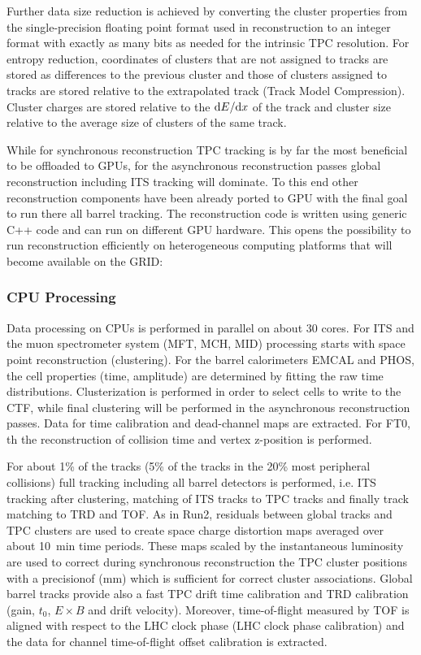 Further data size reduction is achieved by converting the cluster properties from the single-precision 
floating point format used in reconstruction to an integer format with exactly as many bits as needed 
for the intrinsic TPC resolution. For entropy reduction, coordinates of clusters that are not assigned 
to tracks are stored as differences to the previous cluster and those of clusters assigned to tracks 
are stored relative to the extrapolated track (Track Model Compression). Cluster charges are stored 
relative to the ${\rm d}E/{\rm d}x$ of the track and cluster size relative to the average size of 
clusters of the same track.

While for synchronous reconstruction TPC tracking is by far the most beneficial to be offloaded to GPUs, for the 
asynchronous reconstruction passes global reconstruction including ITS tracking will dominate. To this 
end other reconstruction components have been already ported to GPU with the final goal to run there 
all barrel tracking. The reconstruction code is written using generic C++ code and can run on different
GPU hardware. This opens the possibility to run reconstruction efficiently on heterogeneous  
computing platforms that will become available on the GRID:

\subsubsection*{\bf CPU Processing}
Data processing on CPUs is performed in parallel on about 30 cores.
For ITS and the muon spectrometer system (MFT, MCH, MID) processing starts with space point reconstruction (clustering). For the barrel calorimeters EMCAL and PHOS, the cell properties (time, amplitude) are determined by fitting the raw time distributions. Clusterization is performed in order to select cells to write to the CTF, while final clustering will be performed in the asynchronous reconstruction passes. Data for time calibration and dead-channel maps are extracted. For FT0, th the reconstruction of collision time and vertex z-position is performed.

For about 1\% of the tracks (5\% of the tracks in the 20\% most peripheral
collisions) full tracking including all 
barrel detectors is performed, i.e. ITS tracking after clustering, matching of ITS tracks to TPC tracks
and finally track matching to TRD and TOF. As in Run2, residuals between 
global tracks and TPC clusters 
are used to create space charge distortion maps averaged over about 10~min 
time periods. These maps 
scaled by the instantaneous luminosity are used to correct during 
synchronous reconstruction the TPC 
cluster positions with a precisionof (mm) which is sufficient for correct cluster associations.
Global barrel tracks 
provide also a fast TPC drift 
time calibration and TRD calibration (gain, $t_0$, $E \times B$ and drift 
velocity). Moreover, time-of-flight measured by TOF is aligned with respect
to the LHC clock phase (LHC clock phase calibration) and the data for channel 
time-of-flight offset calibration is extracted.

